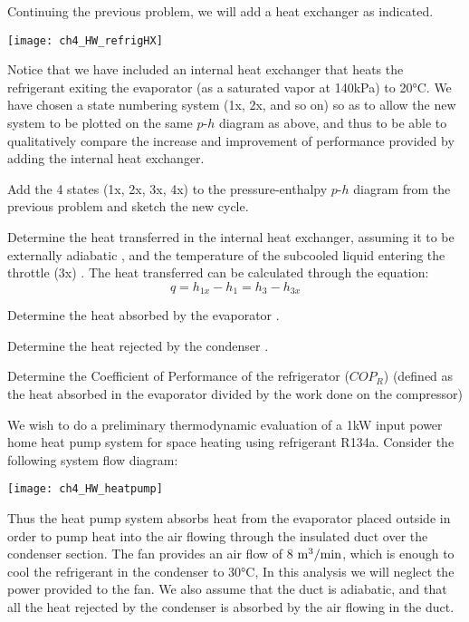 \begin{homework}
  Continuing the previous problem, we will add a heat exchanger as indicated.
  \begin{center}
    \texttt{[image: ch4\_HW\_refrigHX]}
  \end{center}

  Notice that we have included an internal heat exchanger that heats the refrigerant exiting the evaporator (as a saturated vapor at 140kPa) to 20°C. We have chosen a state numbering system (1x, 2x, and so on) so as to allow the new system to be plotted on the same $p$-$h$ diagram as above, and thus to be able to qualitatively compare the increase and improvement of performance provided by adding the internal heat exchanger.
  \begin{questionparts}
  \item Add the 4 states (1x, 2x, 3x, 4x) to the pressure-enthalpy $p$-$h$ diagram from the previous problem and sketch the new cycle.
  \item Determine the heat transferred in the internal heat exchanger, assuming it to be externally adiabatic \answer{ [32.2 kJ/kg]}, and the temperature of the subcooled liquid entering the throttle (3x) \answer{[13.4°C]}.  The heat transferred can be calculated through the equation:
    \begin{equation*}
      q = h_{1x} - h_1 = h_3 - h_{3x}
    \end{equation*}
  \item Determine the heat absorbed by the evaporator \answer{[169 kJ/kg]}.
  \item Determine the heat rejected by the condenser \answer{[235 kJ/kg]}.
  \item Determine the Coefficient of Performance of the refrigerator ($COP_R$) (defined as the heat absorbed in the evaporator divided by the work done on the compressor) 
  \end{questionparts}

  \newpage
  \question We wish to do a preliminary thermodynamic evaluation of a 1kW input power home heat pump system for space heating using refrigerant R134a. Consider the following system flow diagram:
  \begin{center}
    \texttt{[image: ch4\_HW\_heatpump]}
  \end{center}

  Thus the heat pump system absorbs heat from the evaporator placed outside in order to pump heat into the air flowing through the insulated duct over the condenser section. The fan provides an air flow of 8 ${\rm m^3/min}$, which is enough to cool the refrigerant in the condenser to 30°C, In this analysis we will neglect the power provided to the fan. We also assume that the duct is adiabatic, and that all the heat rejected by the condenser is absorbed by the air flowing in the duct.


\end{homework}
